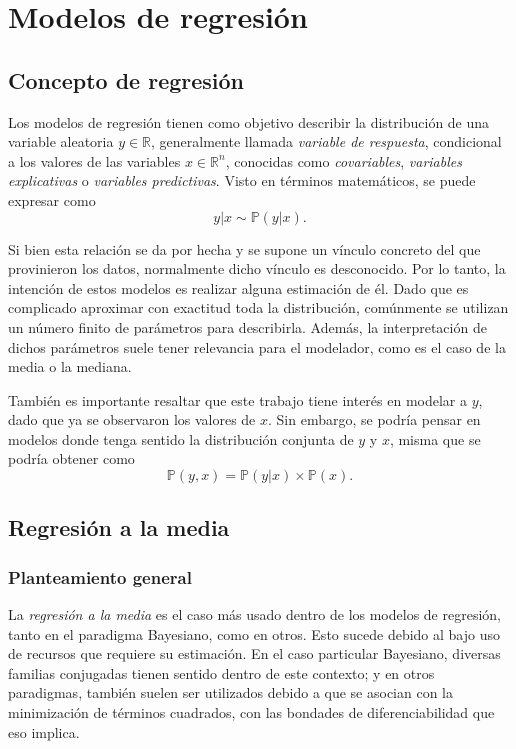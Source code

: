 \chapter[Modelos de regresi\'on]{Modelos de regresi\'on}

\section{Concepto de regresi\'on}

Los modelos de regresi\'on tienen como objetivo describir la distribuci\'on de una variable aleatoria $y \in \mathbb{R}$, generalmente llamada \textit{variable de respuesta}, condicional a los valores de las variables $x \in \mathbb{R}^n$, conocidas como \textit{covariables}, \textit{variables explicativas} o \textit{variables predictivas}. Visto en t\'erminos matem\'aticos, se puede expresar como
\begin{equation*}
    y|x \sim \mathbb{P}(y|x).
\end{equation*}

Si bien esta relaci\'on se da por hecha y se supone un v\'inculo concreto del que provinieron los datos, normalmente dicho v\'inculo es desconocido. Por lo tanto, la intenci\'on de estos modelos es realizar alguna estimaci\'on de \'el. Dado que es complicado aproximar con exactitud toda la distribuci\'on, com\'unmente se utilizan un n\'umero finito de par\'ametros para describirla. Adem\'as, la interpretaci\'on de dichos par\'ametros suele tener relevancia para el modelador, como es el caso de la media o la mediana. 

Tambi\'en es importante resaltar que este trabajo tiene inter\'es en modelar a $y$, dado que ya se observaron los valores de $x$. Sin embargo, se podr\'ia pensar en modelos donde tenga sentido la distribuci\'on conjunta de $y$ y $x$, misma que se podr\'ia obtener como
\begin{equation*}
    \mathbb{P}(y,x) = \mathbb{P}(y|x) \times \mathbb{P}(x).
\end{equation*}

\section{Regresión a la media}

\subsection{Planteamiento general}

La \textit{regresi\'on a la media} es el caso m\'as usado dentro de los modelos de regresi\'on, tanto en el paradigma Bayesiano, como en otros. Esto sucede debido al bajo uso de recursos que requiere su estimaci\'on. En el caso particular Bayesiano, diversas familias conjugadas tienen sentido dentro de este contexto; y en otros paradigmas, tambi\'en suelen ser utilizados debido a que se asocian con la minimizaci\'on de t\'erminos cuadrados, con las bondades de diferenciabilidad que eso implica. 

